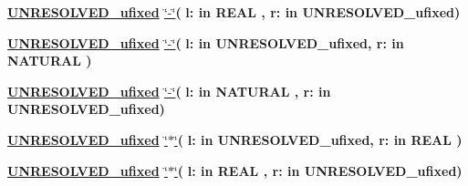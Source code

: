 \begin{DoxyCompactItemize}
\item 
{\bfseries {\bfseries {\bfseries \hyperlink{classfixed__pkg_ae78bc2b36d22f6abeac163955e8a587d}{U\+N\+R\+E\+S\+O\+L\+V\+E\+D\+\_\+ufixed}} \textcolor{vhdlchar}{ }}} \hyperlink{classfixed__pkg_a39970596105025f91b3839479d54d447}{\char`\"{}-\/\char`\"{}}{\bfseries  ( }{\bfseries \textcolor{vhdlchar}{l\+: }\textcolor{stringliteral}{in }{\bfseries \textcolor{comment}{R\+E\+A\+L}\textcolor{vhdlchar}{ }}}{\bfseries  , \textcolor{vhdlchar}{r\+: }\textcolor{stringliteral}{in }\textcolor{vhdlchar}{U\+N\+R\+E\+S\+O\+L\+V\+E\+D\+\_\+ufixed}}{\bfseries  )} 
\item 
{\bfseries {\bfseries {\bfseries \hyperlink{classfixed__pkg_ae78bc2b36d22f6abeac163955e8a587d}{U\+N\+R\+E\+S\+O\+L\+V\+E\+D\+\_\+ufixed}} \textcolor{vhdlchar}{ }}} \hyperlink{classfixed__pkg_a39970596105025f91b3839479d54d447}{\char`\"{}-\/\char`\"{}}{\bfseries  ( }{\bfseries \textcolor{vhdlchar}{l\+: }\textcolor{stringliteral}{in }\textcolor{vhdlchar}{U\+N\+R\+E\+S\+O\+L\+V\+E\+D\+\_\+ufixed}}{\bfseries  , \textcolor{vhdlchar}{r\+: }\textcolor{stringliteral}{in }{\bfseries \textcolor{comment}{N\+A\+T\+U\+R\+A\+L}\textcolor{vhdlchar}{ }}}{\bfseries  )} 
\item 
{\bfseries {\bfseries {\bfseries \hyperlink{classfixed__pkg_ae78bc2b36d22f6abeac163955e8a587d}{U\+N\+R\+E\+S\+O\+L\+V\+E\+D\+\_\+ufixed}} \textcolor{vhdlchar}{ }}} \hyperlink{classfixed__pkg_a39970596105025f91b3839479d54d447}{\char`\"{}-\/\char`\"{}}{\bfseries  ( }{\bfseries \textcolor{vhdlchar}{l\+: }\textcolor{stringliteral}{in }{\bfseries \textcolor{comment}{N\+A\+T\+U\+R\+A\+L}\textcolor{vhdlchar}{ }}}{\bfseries  , \textcolor{vhdlchar}{r\+: }\textcolor{stringliteral}{in }\textcolor{vhdlchar}{U\+N\+R\+E\+S\+O\+L\+V\+E\+D\+\_\+ufixed}}{\bfseries  )} 
\item 
{\bfseries {\bfseries {\bfseries \hyperlink{classfixed__pkg_ae78bc2b36d22f6abeac163955e8a587d}{U\+N\+R\+E\+S\+O\+L\+V\+E\+D\+\_\+ufixed}} \textcolor{vhdlchar}{ }}} \hyperlink{classfixed__pkg_a72ee02603ebb0ddcc88451a45e24e9e0}{\char`\"{}$\ast$\char`\"{}}{\bfseries  ( }{\bfseries \textcolor{vhdlchar}{l\+: }\textcolor{stringliteral}{in }\textcolor{vhdlchar}{U\+N\+R\+E\+S\+O\+L\+V\+E\+D\+\_\+ufixed}}{\bfseries  , \textcolor{vhdlchar}{r\+: }\textcolor{stringliteral}{in }{\bfseries \textcolor{comment}{R\+E\+A\+L}\textcolor{vhdlchar}{ }}}{\bfseries  )} 
\item 
{\bfseries {\bfseries {\bfseries \hyperlink{classfixed__pkg_ae78bc2b36d22f6abeac163955e8a587d}{U\+N\+R\+E\+S\+O\+L\+V\+E\+D\+\_\+ufixed}} \textcolor{vhdlchar}{ }}} \hyperlink{classfixed__pkg_a72ee02603ebb0ddcc88451a45e24e9e0}{\char`\"{}$\ast$\char`\"{}}{\bfseries  ( }{\bfseries \textcolor{vhdlchar}{l\+: }\textcolor{stringliteral}{in }{\bfseries \textcolor{comment}{R\+E\+A\+L}\textcolor{vhdlchar}{ }}}{\bfseries  , \textcolor{vhdlchar}{r\+: }\textcolor{stringliteral}{in }\textcolor{vhdlchar}{U\+N\+R\+E\+S\+O\+L\+V\+E\+D\+\_\+ufixed}}{\bfseries  )} 

\end{DoxyCompactItemize}
